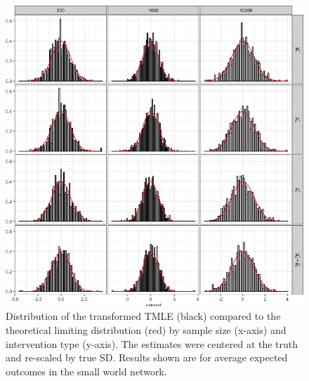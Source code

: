 \documentclass[english]{article}\usepackage[]{graphicx}\usepackage[]{color}
\makeatletter
\def\maxwidth{ %
  \ifdim\Gin@nat@width>\linewidth
    \linewidth
  \else
    \Gin@nat@width
  \fi
}
\newenvironment{knitrout}{}{} %
\theoremstyle{plain}
\theoremstyle{plain}
\makeatother
\begin{document}
\begin{knitrout}\footnotesize
{}\color{fgcolor}\begin{figure}

{\centering \includegraphics[width=\maxwidth]{TablesFigs/knitR-hist_TMLE_EY_smwld-1} 

}

\caption[Distribution of the transformed TMLE (black) compared to the theoretical limiting distribution (red) by sample size (x-axis) and intervention type (y-axis)]{Distribution of the transformed TMLE (black) compared to the theoretical limiting distribution (red) by sample size (x-axis) and intervention type (y-axis). The estimates were centered at the truth and re-scaled by true SD. Results shown are for average expected outcomes in the small world network.}\label{fig:hist.TMLE.EY.smwld}
\end{figure}


\end{knitrout}

\newpage
\end{document}

